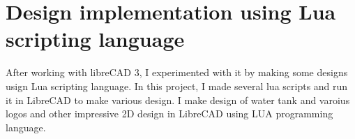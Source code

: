 \section{Design implementation using Lua scripting language}
After working with libreCAD 3, I experimented with it by making some designs usign Lua scripting language.
\noindent In this project, I made  several lua scripts and run it in LibreCAD to make various design. I make design of water tank and varoius logos and other impressive 2D design in LibreCAD using LUA programming language. 